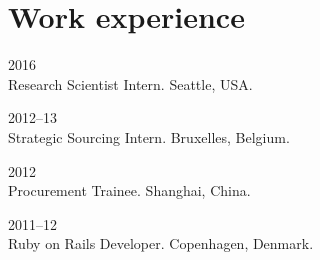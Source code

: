 \section*{Work experience}

\begin{paracol}{2}
  2016
\switchcolumn
  \\
  Research Scientist Intern. Seattle, USA.
\end{paracol}

\begin{paracol}{2}
  2012--13
\switchcolumn
  \\
  Strategic Sourcing Intern. Bruxelles, Belgium.
\end{paracol}

\begin{paracol}{2}
  2012
\switchcolumn
  \\
  Procurement Trainee. Shanghai, China.
\end{paracol}

\begin{paracol}{2}
  2011--12
\switchcolumn
  \\
  Ruby on Rails Developer. Copenhagen, Denmark.
\end{paracol}